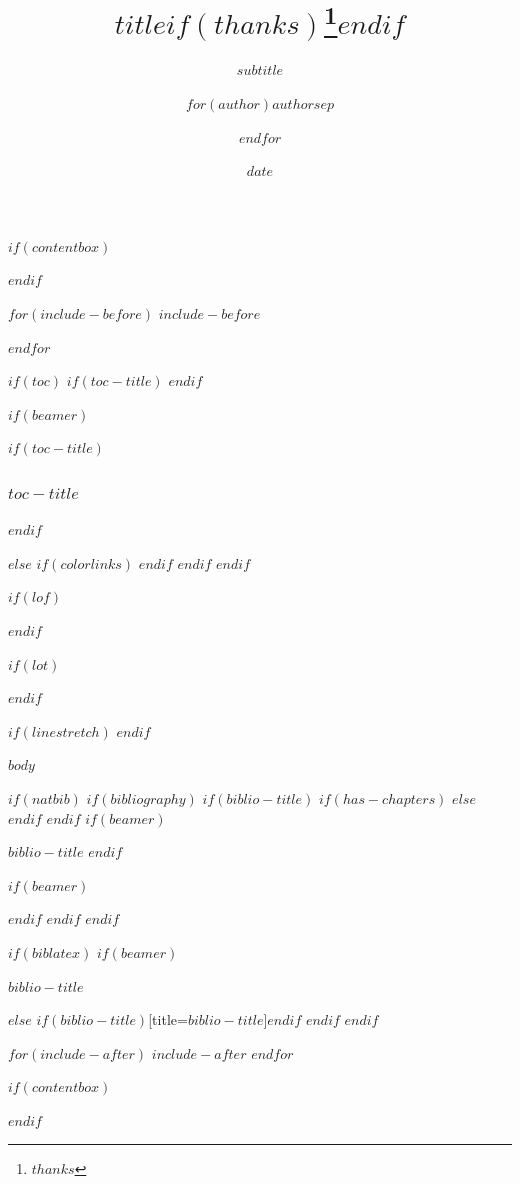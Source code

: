 \documentclass[
$if(fontsize)$
  $fontsize$,
$endif$
$if(papersize)$
  $papersize$paper,
$endif$
$if(beamer)$
  ignorenonframetext,
$if(handout)$
  handout,
$endif$
$if(aspectratio)$
  aspectratio=$aspectratio$,
$endif$
$if(babel-lang)$
  $babel-lang$,
$endif$
$endif$
$for(classoption)$
  $classoption$$sep$,
$endfor$
]{$documentclass$}
\title{$title$$if(thanks)$\thanks{$thanks$}$endif$}
\subtitle{$subtitle$}
\author{$for(author)$$author$$sep$ \and $endfor$}
\date{$date$}
\institute{$for(institute)$$institute$$sep$ \and $endfor$}
\newif\ifbibliography
\begin{document}
\pagestyle{eng_header}

$if(contentbox)$
\begin{mdframed}
$endif$


$for(include-before)$
$include-before$

$endfor$

$if(toc)$
  $if(toc-title)$
  \renewcommand*\contentsname{$toc-title$}
  $endif$

  $if(beamer)$
  \begin{frame}[allowframebreaks]
    $if(toc-title)$
      \frametitle{$toc-title$}
    $endif$
    \setcounter{tocdepth}{$toc-depth$}
    \tableofcontents
    \end{frame}
  $else$
    {
    $if(colorlinks)$
    \hypersetup{linkcolor=$if(toccolor)$$toccolor$$else$$endif$}
    $endif$
    \setcounter{tocdepth}{$toc-depth$}
    \tableofcontents
    }
  $endif$
$endif$

$if(lof)$
\listoffigures
$endif$

$if(lot)$
\listoftables
$endif$

$if(linestretch)$
$endif$

$body$

$if(natbib)$
  $if(bibliography)$
    $if(biblio-title)$
      $if(has-chapters)$
      \renewcommand\bibname{$biblio-title$}
      $else$
      \renewcommand\refname{$biblio-title$}
      $endif$
    $endif$
    $if(beamer)$
    \begin{frame}[allowframebreaks]{$biblio-title$}
      \bibliographytrue
    $endif$
    
    $if(beamer)$
    \end{frame}
    $endif$
  $endif$
$endif$

$if(biblatex)$
  $if(beamer)$
  \begin{frame}[allowframebreaks]{$biblio-title$}
    \bibliographytrue
    \printbibliography[heading=none]
  \end{frame}
  $else$
  \printbibliography$if(biblio-title)$[title=$biblio-title$]$endif$
  $endif$
$endif$

$for(include-after)$
  $include-after$
$endfor$

$if(contentbox)$
  \end{mdframed}
$endif$
\label{LastPage}
\end{document}
